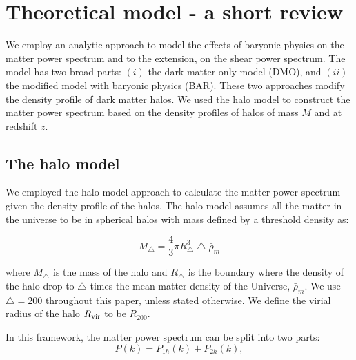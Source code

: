 \documentclass[
  11pt,
  twoside,
  openright,
  titlepage,
  headings=optiontoheadandtoc
]{scrbook}
\begin{document}

\section{Theoretical model - a short review}
\label{p3:sec:theory}

We employ an analytic approach to model the effects of baryonic physics on the matter power spectrum and to the extension, on the shear power spectrum. The model has two broad parts: $(i)$ the dark-matter-only model (DMO), and $(ii)$ the modified model with baryonic physics (BAR). These two approaches modify the density profile of dark matter halos. We used the halo model \citep{2000MNRAS.318..203S,2000MNRAS.318.1144P,2000ApJ...543..503M,2002PhR...372....1C} to construct the matter power spectrum based on the density profiles of halos of mass $M$ and at redshift $z$.


\subsection{The halo model}\label{p3:sec:halomodel}

We employed the halo model \citep{1977ApJ...217..331M,2000MNRAS.318..203S,2000ApJ...543..503M,2000MNRAS.318.1144P,2002PhR...372....1C} approach to calculate the matter power spectrum given the density profile of the halos. The halo model assumes all the matter in the universe to be in spherical halos with mass defined by a threshold density as:

\begin{equation}
	M_{\bigtriangleup} = \dfrac{4}{3} \pi R_{\bigtriangleup}^3 \bigtriangleup \bar{\rho}_{m}
\end{equation}

where $M_{\bigtriangleup}$ is the mass of the halo and $R_{\bigtriangleup}$ is the boundary where the density of the halo drop to $\bigtriangleup$ times the mean matter density of the Universe, $\bar{\rho}_{m}$. We use $\bigtriangleup=200$ throughout this paper, unless stated otherwise. We define the virial radius of the halo $R_{\rm vir}$ to be $R_{200}$.


In this framework, the matter power spectrum can be split into two parts:
\begin{equation}
	P(k) = P_{1h}(k) + P_{2h}(k),
\end{equation}
\end{document}
